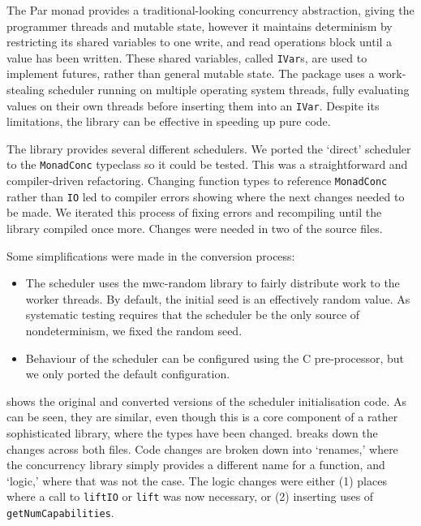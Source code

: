 The Par monad\cite{marlow2011} provides a traditional-looking
concurrency abstraction, giving the programmer threads and mutable
state, however it maintains determinism by restricting its shared
variables to one write, and read operations block until a value has
been written.  These shared variables, called \verb|IVar|s, are used
to implement futures\cite{marlow2011}, rather than general mutable
state.  The package uses a work-stealing scheduler\cite{marlow2011}
running on multiple operating system threads, fully evaluating values
on their own threads before inserting them into an \verb|IVar|.
Despite its limitations, the library can be effective in speeding up
pure code\cite{marlow2011}.

The library provides several different schedulers.  We ported the
`direct' scheduler to the \verb|MonadConc| typeclass so it could be
tested.  This was a straightforward and compiler-driven refactoring.
Changing function types to reference \verb|MonadConc| rather than
\verb|IO| led to compiler errors showing where the next changes needed
to be made.  We iterated this process of fixing errors and recompiling
until the library compiled once more.  Changes were needed in two of
the source files.

Some simplifications were made in the conversion process:

\begin{itemize}
\item The scheduler uses the mwc-random\cite{mwc_random} library to
  fairly distribute work to the worker threads.  By default, the
  initial seed is an effectively random value.  As systematic testing
  requires that the scheduler be the only source of nondeterminism, we
  fixed the random seed.
\item Behaviour of the scheduler can be configured using the C
  pre-processor, but we only ported the default configuration.
\end{itemize}

 shows the original and converted
versions of the scheduler initialisation code.  As can be seen, they
are similar, even though this is a core component of a rather
sophisticated library, where the types have been changed.
 breaks down the changes across both
files.  Code changes are broken down into `renames,' where the
concurrency library simply provides a different name for a function,
and `logic,' where that was not the case.  The logic changes were
either (1) places where a call to \verb|liftIO| or \verb|lift| was now
necessary, or (2) inserting uses of \verb|getNumCapabilities|.

